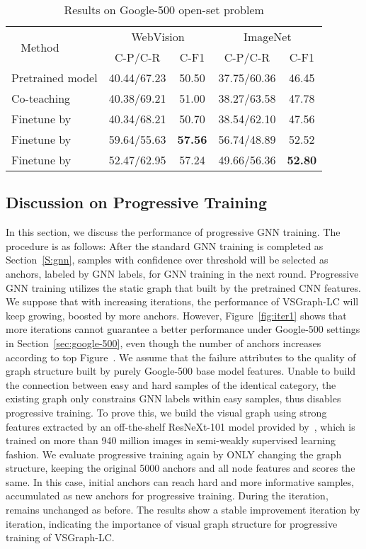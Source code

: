 \documentclass[sigconf]{acmart}
\begin{document}
\setlength{\tabcolsep}{4pt}
\begin{table}
	\centering
	\caption{Results on Google-500 open-set problem}
	\label{tab:openset}
\begin{tabular}{lcccc}
		\toprule
		\multirow{2}{*}{~ Method}  & \multicolumn{2}{c}{WebVision} & \multicolumn{2}{c}{ImageNet} \\
		\multicolumn{1}{c}{} & \multicolumn{1}{c}{C-P/C-R} & \multicolumn{1}{c}{C-F1}  & \multicolumn{1}{c}{C-P/C-R} & \multicolumn{1}{c}{C-F1}  \\
		\midrule
		Pretrained model    &40.44/67.23	& 50.50 & 37.75/60.36 & 46.45\\
		Co-teaching         &40.38/69.21    & 51.00 & 38.27/63.58 & 47.78\\
		Finetune by    &40.34/68.21    & 50.70 & 38.54/62.10 & 47.56\\
		Finetune by    &59.64/55.63	& \textbf{57.56} & 56.74/48.89  &52.52\\
		Finetune by    &52.47/62.95	&57.24 &49.66/56.36	& \textbf{52.80}\\
		\bottomrule
	\end{tabular}
\end{table}
\setlength{\tabcolsep}{1.4pt}

\subsection{Discussion on Progressive Training}
\label{S:iterative}
In this section, we discuss the performance of progressive GNN training. The procedure is as follows:
After the standard GNN training is completed as Section~\ref{S:gnn}, samples with confidence over threshold  will be selected as anchors, labeled by GNN labels, for GNN training in the next round. 
Progressive GNN training utilizes the static graph that built by the pretrained CNN features. We suppose that with increasing iterations, the performance of VSGraph-LC will keep growing, boosted by more anchors.
However, Figure~\ref{fig:iter1} shows that more iterations cannot guarantee a better performance under Google-500 settings in Section~\ref{sec:google-500}, even though the number of anchors increases according to top Figure~.
We assume that the failure attributes to the quality of graph structure  built by purely Google-500 base model features. Unable to build the connection between easy and hard samples of the identical category, the existing graph  only constrains GNN labels within easy samples, thus disables progressive training.
To prove this, we build the visual graph using strong features extracted by an off-the-shelf ResNeXt-101 model provided by~\cite{yalniz2019billion}, which is trained on more than 940 million images in semi-weakly supervised learning fashion.
We evaluate progressive training again by ONLY changing the graph structure, keeping the original 5000 anchors and all node features and scores the same. 
In this case, initial anchors can reach hard and more informative samples, accumulated as new anchors for progressive training. During the iteration,  remains unchanged as before.
The results show a stable improvement iteration by iteration, indicating the importance of visual graph structure for progressive training of VSGraph-LC.
\end{document}
